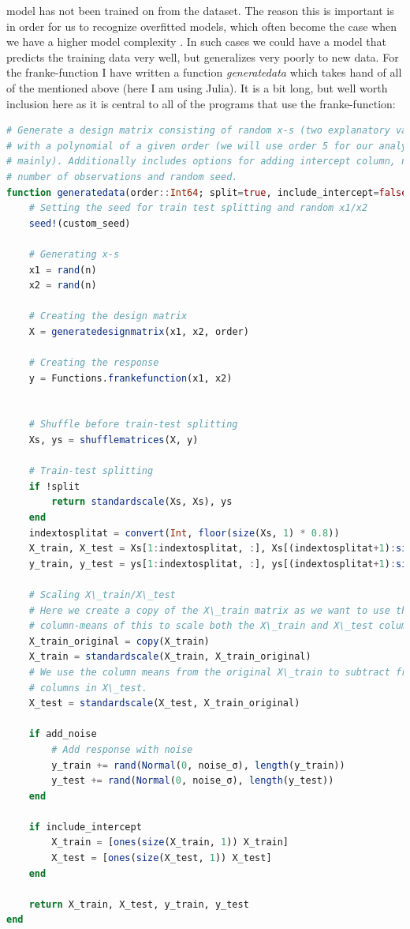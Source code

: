 \documentclass{article}
\begin{document}
model has not been trained on from the dataset. The reason this is important is
in order for us to recognize overfitted models, which often become the case when
we have a higher model complexity \cite[s.~7.2]{hastie2009elements}. In such
cases we could have a model that predicts the training data very well, but
generalizes very poorly to new data.  For the franke-function I have written a
function \textit{generatedata} which takes hand of all of the mentioned above
(here I am using Julia). It is a bit long, but well worth inclusion here as it
is central to all of the programs that use the franke-function:
\begin{lstlisting}[language=julia]
# Generate a design matrix consisting of random x-s (two explanatory variables)
# with a polynomial of a given order (we will use order 5 for our analysis
# mainly). Additionally includes options for adding intercept column, noise,
# number of observations and random seed.
function generatedata(order::Int64; split=true, include_intercept=false, add_noise=false, noise_σ=0.1, n=200, custom_seed=1000)
    # Setting the seed for train test splitting and random x1/x2
    seed!(custom_seed)

    # Generating x-s
    x1 = rand(n)
    x2 = rand(n)

    # Creating the design matrix
    X = generatedesignmatrix(x1, x2, order)

    # Creating the response
    y = Functions.frankefunction(x1, x2)


    # Shuffle before train-test splitting
    Xs, ys = shufflematrices(X, y)

    # Train-test splitting
    if !split
        return standardscale(Xs, Xs), ys
    end
    indextosplitat = convert(Int, floor(size(Xs, 1) * 0.8))
    X_train, X_test = Xs[1:indextosplitat, :], Xs[(indextosplitat+1):size(Xs, 1), :]
    y_train, y_test = ys[1:indextosplitat, :], ys[(indextosplitat+1):size(ys, 1), :]

    # Scaling X\_train/X\_test
    # Here we create a copy of the X\_train matrix as we want to use the
    # column-means of this to scale both the X\_train and X\_test columns.
    X_train_original = copy(X_train)
    X_train = standardscale(X_train, X_train_original)
    # We use the column means from the original X\_train to subtract from the
    # columns in X\_test.
    X_test = standardscale(X_test, X_train_original)

    if add_noise
        # Add response with noise
        y_train += rand(Normal(0, noise_σ), length(y_train))
        y_test += rand(Normal(0, noise_σ), length(y_test))
    end

    if include_intercept
        X_train = [ones(size(X_train, 1)) X_train]
        X_test = [ones(size(X_test, 1)) X_test]
    end

    return X_train, X_test, y_train, y_test
end
\end{lstlisting}
\end{document}
